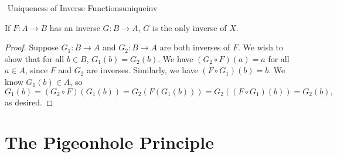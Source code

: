    \begin{theorem}{\Stop\,\,Uniqueness of Inverse Functions}{uniqueinv}
        
        If \(F:A\to B\) has an inverse \(G:B\to A\), \(G\) is the only inverse of \(X\).
        \begin{proof}
            Suppose \(G_1:B\to A\) and \(G_2:B\to A\) are both inverses of \(F\). We wish to show that for all \(b\in B\), \(G_1(b)=G_2(b)\). We have \((G_2\circ F)(a)=a\) for all \(a\in A\), since \(F\) and \(G_2\) are inverses. Similarly, we have \((F\circ G_1)(b)=b\). We know \(G_1(b)\in A\), so
            \begin{equation*}
                G_1(b)=(G_2\circ F)(G_1(b))=G_2(F(G_1(b)))=G_2((F\circ G_1)(b))=G_2(b),
            \end{equation*}
            as desired.
        \end{proof}

    \end{theorem}

\pagebreak

\section{The Pigeonhole Principle}


